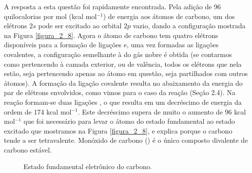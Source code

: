 A resposta a esta questão foi rapidamente encontrada. Pela adição de 96 quilocalorias por mol (kcal mol$^{-1}$) de energia aos átomos de carbono, um dos elétrons $2s$ pode ser excitado ao orbital $2p$ vazio, dando a configuração mostrada na Figura \ref{figura_2_8}. Agora o átomo de carbono tem quatro elétrons disponíveis para a formação de ligações e, uma vez formadas as ligações covalentes, a configuração semelhante à do gás nobre é obtida (se contarmos como pertencendo à camada exterior, ou de valência, todos os elétrons que nela estão, seja pertencendo apenas ao átomo em questão, seja partilhados com outros átomos). A formação da ligação covalente resulta no abaixamento da energia do par de elétrons envolvidos, como vimos para o caso da reação  (Seção 2.4). Na reação  formam-se duas ligações , o que resulta em um decréscimo de energia da ordem de 174 kcal mol$^{-1}$. Este decréscimo supera de muito o aumento de 96 kcal mol$^{-1}$ que foi necessário para levar o átomo do estado fundamental ao estado excitado que mostramos na Figura \ref{figura_2_8}, e explica porque o carbono tende a ser tetravalente. Monóxido de carbono () é o único composto divalente de carbono estável. 

\begin{figure}[H]
    \centering
    \caption{Estado fundamental eletrônico do carbono.}
    \label{figura_2_7}
\end{figure}

